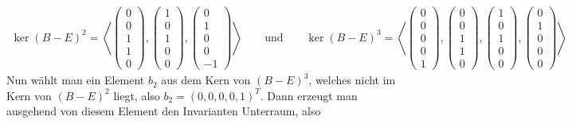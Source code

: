     \begin{align*}
        \ker (B-E)^2 = \left\langle
        \begin{pmatrix}
            0\\0\\1\\1\\0
        \end{pmatrix},
        \begin{pmatrix}
            1\\0\\1\\0\\0
        \end{pmatrix},
        \begin{pmatrix}
            0\\1\\0\\0\\-1
        \end{pmatrix}
        \right\rangle \qquad \text{und} \qquad
        \ker (B-E)^3 = \left\langle
        \begin{pmatrix}
            0\\0\\0\\0\\1
        \end{pmatrix},
        \begin{pmatrix}
            0\\0\\1\\1\\0
        \end{pmatrix},
        \begin{pmatrix}
            1\\0\\1\\0\\ 0
        \end{pmatrix},
        \begin{pmatrix}
            0\\1\\0\\0\\0
        \end{pmatrix}
        \right\rangle
    \end{align*}
    Nun wählt man ein Element $b_2$ aus dem Kern von $(B-E)^3$, welches nicht im Kern von $(B-E)^2$ liegt, also $b_2=(0,0,0,0,1)^T$.
    Dann erzeugt man ausgehend von diesem Element den Invarianten Unterraum, also
